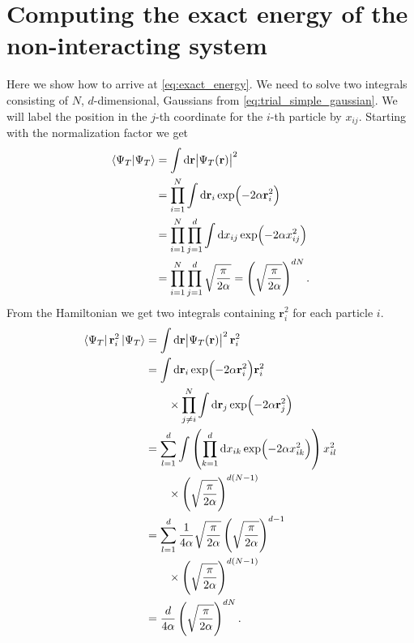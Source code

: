 \documentclass[
    a4paper, aps, twocolumn, floatfix, superscriptaddress,
    nofootinbib]{revtex4-1}
\newcommand{\vf}{\mathbf}
\newcommand{\1}{\mathds{1}}
\newcommand{\para}[1]{\left(#1\right)}
\begin{document}

\clearpage

\appendix
\section{Computing the exact energy of the non-interacting system}
    Here we show how to arrive at \autoref{eq:exact_energy}. We need to solve
    two integrals consisting of $N$, $d$-dimensional, Gaussians from
    \autoref{eq:trial_simple_gaussian}. We will label the position in the $j$-th
    coordinate for the $i$-th particle by $x_{ij}$. Starting with the
    normalization factor we get
    \begin{align}
        \bra{\Psi_T}\ket{\Psi_T}
        &=
        \int\dd\vf{r}\abs{\Psi_T(\vf{r})}^2
        \\
        &=
        \prod_{i = 1}^N
        \int\dd\vf{r}_i\exp(-2\alpha\vf{r}_i^2)
        \\
        &=
        \prod_{i = 1}^N
        \prod_{j = 1}^d
        \int\dd x_{ij}\exp(-2\alpha x_{ij}^2)
        \\
        &=
        \prod_{i = 1}^N
        \prod_{j = 1}^d
        \sqrt{\frac{\pi}{2\alpha}}
        = \para{
            \sqrt{\frac{\pi}{2\alpha}}
        }^{dN}.
    \end{align}
    From the Hamiltonian we get two integrals containing $\vf{r}_i^2$ for each
    particle $i$.
    \begin{align}
        \bra{\Psi_T}\vf{r}_i^2\ket{\Psi_T}
        &=
        \int\dd\vf{r}\abs{\Psi_T(\vf{r})}^2\vf{r}_i^2
        \\
        &=
        \int\dd\vf{r}_i\exp(-2\alpha\vf{r}_i^2)\vf{r}_i^2
        \nonumber \\
        &\qquad
        \times
        \prod_{j \neq i}^N
        \int\dd\vf{r}_j\exp(-2\alpha\vf{r}_j^2)
        \\
        &=
        \sum_{l = 1}^d
        \int
        \para{
            \prod_{k = 1}^d
            \dd x_{ik}\exp(-2\alpha x_{ik}^2)
        } x_{il}^2
        \nonumber\\
        &\qquad
        \times
        \para{
            \sqrt{\frac{\pi}{2\alpha}}
        }^{d(N - 1)}
        \\
        &=
        \sum_{l = 1}^d
        \frac{1}{4\alpha}\sqrt{\frac{\pi}{2\alpha}}
        \para{
            \sqrt{\frac{\pi}{2\alpha}}
        }^{d - 1}
        \nonumber\\
        &\qquad
        \times
        \para{
            \sqrt{\frac{\pi}{2\alpha}}
        }^{d(N - 1)}
        \\
        &= \frac{d}{4\alpha}\para{
            \sqrt{\frac{\pi}{2\alpha}}
        }^{dN}.
    \end{align}
\end{document}
